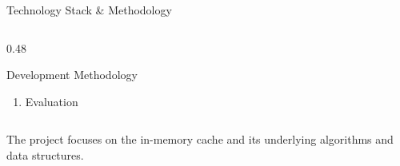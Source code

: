 \documentclass[aspectratio=169,10pt]{beamer}
\begin{document}
\begin{frame}{Technology Stack \& Methodology}
\begin{columns}[T]
\begin{column}{0.48\textwidth}
\begin{block}{Development Methodology}
\begin{enumerate}
\item Evaluation

\end{enumerate}

\end{block}

\end{column}

\end{columns}

\vfill

\begin{center}

\small
\textcolor{GEUGrey}{
The project focuses on the in-memory cache and its underlying
algorithms and data structures.
}

\end{center}

\end{frame}


\end{document}

